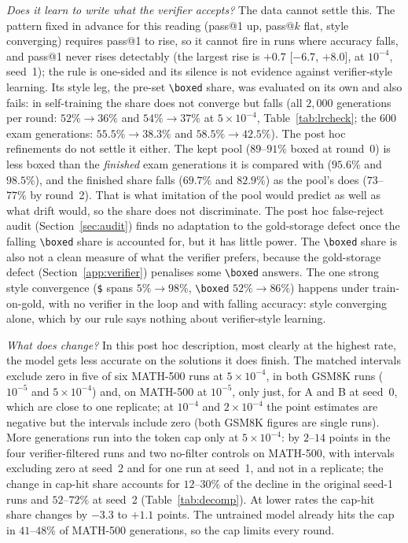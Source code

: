\documentclass[runningheads]{llncs}
\begin{document}
\emph{Does it learn to write what the verifier accepts?} The data cannot settle
this. The pattern fixed in advance for this reading (pass@1 up, pass@$k$ flat,
style converging) requires pass@1 to rise, so it cannot fire in runs where
accuracy falls, and pass@1 never rises detectably (the largest rise is $+0.7$
[$-6.7$, $+8.0$], at $10^{-4}$, seed~1); the rule is one-sided and its silence is
not evidence against verifier-style learning. Its style leg, the pre-set
\verb|\boxed| share, was evaluated on its own and also fails: in self-training
the share does not converge but falls (all $2{,}000$ generations per round:
$52\%\to36\%$ and $54\%\to37\%$ at $5\times10^{-4}$, Table~\ref{tab:lrcheck};
the $600$ exam generations: $55.5\%\to38.3\%$ and $58.5\%\to42.5\%$). The post
hoc refinements do not settle it either. The kept pool ($89$--$91\%$ boxed at
round~0) is less boxed than the \emph{finished} exam generations it is compared
with ($95.6\%$ and $98.5\%$), and the finished share falls ($69.7\%$ and
$82.9\%$) as the pool's does ($73$--$77\%$ by round~2). That is what imitation of
the pool would predict as well as what drift would, so the share does not
discriminate. The post hoc false-reject audit (Section~\ref{sec:audit}) finds
no adaptation to the gold-storage defect once the falling \verb|\boxed| share
is accounted for, but it has little power. The \verb|\boxed| share is also not a
clean measure of what the verifier prefers, because the gold-storage defect
(Section~\ref{app:verifier}) penalises some \verb|\boxed| answers. The one strong style convergence (\texttt{\$} spans
$5\%\to98\%$, \verb|\boxed| $52\%\to86\%$) happens under train-on-gold, with no
verifier in the loop and with falling accuracy: style converging alone, which by
our rule says nothing about verifier-style learning.

\emph{What does change?} In this post hoc description, most clearly at the
highest rate, the model gets less accurate on the solutions it does finish. The matched intervals exclude zero in five of six MATH-500 runs at
$5\times10^{-4}$, in both GSM8K runs ($10^{-5}$ and $5\times10^{-4}$) and, on
MATH-500 at $10^{-5}$, only just, for A and B at seed~0, which are close to one
replicate; at $10^{-4}$ and $2\times10^{-4}$ the point estimates are negative
but the intervals include zero (both GSM8K figures are single runs). More
generations run into the token cap only at $5\times10^{-4}$: by $2$--$14$ points in
the four verifier-filtered runs and two no-filter controls on MATH-500, with
intervals excluding zero at seed~2 and for one run at seed~1, and not in a
replicate; the change in cap-hit share accounts for $12$--$30\%$ of the decline
in the original seed-1 runs and $52$--$72\%$ at seed~2 (Table~\ref{tab:decomp}). At lower rates
the cap-hit share changes by $-3.3$ to $+1.1$ points. The untrained model already
hits the cap in $41$--$48\%$ of MATH-500 generations, so the cap limits every
round.
\end{document}

